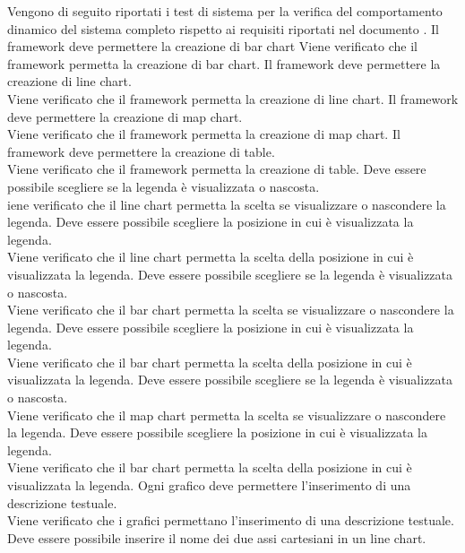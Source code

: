 Vengono di seguito riportati i test di sistema per la verifica del comportamento dinamico del sistema completo rispetto ai requisiti riportati nel documento .
 Il framework deve permettere la creazione di bar chart
Viene verificato che il framework permetta la creazione di bar chart.
	Il framework deve permettere la creazione di line chart.\\
Viene verificato che il framework permetta la creazione di line chart.
	Il framework deve permettere la creazione di map chart.\\
Viene verificato che il framework permetta la creazione di map chart.
	Il framework deve permettere la creazione di table.\\
Viene verificato che il framework permetta la creazione di table.
 Deve essere possibile scegliere se la legenda è visualizzata o nascosta.\\
iene verificato che il line chart permetta la scelta se visualizzare o nascondere la legenda.
 Deve essere possibile scegliere la posizione in cui è visualizzata la legenda.\\
Viene verificato che il line chart permetta la scelta della posizione in cui è visualizzata la legenda.
 Deve essere possibile scegliere se la legenda è visualizzata o nascosta.\\
Viene verificato che il bar chart permetta la scelta se visualizzare o nascondere la legenda.
	Deve essere possibile scegliere la posizione in cui è visualizzata la legenda.\\
Viene verificato che il bar chart permetta la scelta della posizione in cui è visualizzata la legenda.
 Deve essere possibile scegliere se la legenda è visualizzata o nascosta.\\
Viene verificato che il map chart permetta la scelta se visualizzare o nascondere la legenda.
 Deve essere possibile scegliere la posizione in cui è visualizzata la legenda.\\
Viene verificato che il bar chart permetta la scelta della posizione in cui è visualizzata la legenda.
 Ogni grafico deve permettere l'inserimento di una descrizione testuale.\\
Viene verificato che i grafici permettano l'inserimento di una descrizione testuale.
	Deve essere possibile inserire il nome dei due assi cartesiani in un line chart.\\
